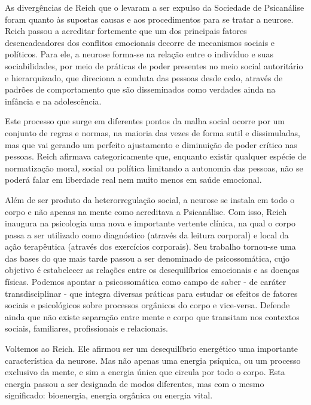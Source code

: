 As divergências de Reich que o levaram a ser expulso da Sociedade de
Psicanálise foram quanto às supostas causas e aos procedimentos para se
tratar a neurose. Reich passou a acreditar fortemente que um dos
principais fatores desencadeadores dos conflitos emocionais decorre de
mecanismos sociais e políticos. Para ele, a neurose forma-se na relação
entre o indivíduo e suas sociabilidades, por meio de práticas de poder
presentes no meio social autoritário e hierarquizado, que direciona a
conduta das pessoas desde cedo, através de padrões de comportamento que
são disseminados como verdades ainda na infância e na adolescência.

Este processo que surge em diferentes pontos da malha social ocorre por
um conjunto de regras e normas, na maioria das vezes de forma sutil e
dissimuladas, mas que vai gerando um perfeito ajustamento e diminuição
de poder crítico nas pessoas. Reich afirmava categoricamente que,
enquanto existir qualquer espécie de normatização moral, social ou
política limitando a autonomia das pessoas, não se poderá falar em
liberdade real nem muito menos em saúde emocional.

Além de ser produto da heterorregulação social, a neurose se instala em
todo o corpo e não apenas na mente como acreditava a Psicanálise. Com
isso, Reich inaugura na psicologia uma nova e importante vertente
clínica, na qual o corpo passa a ser utilizado como diagnóstico (através
da leitura corporal) e local da ação terapêutica (através dos exercícios
corporais). Seu trabalho tornou-se uma das bases do que mais tarde
passou a ser denominado de psicossomática, cujo objetivo é estabelecer
as relações entre os desequilíbrios emocionais e as doenças físicas.
Podemos apontar a psicossomática como campo de saber - de caráter
transdisciplinar - que integra diversas práticas para estudar os efeitos
de fatores sociais e psicológicos sobre processos orgânicos do corpo e
vice-versa. Defende ainda que não existe separação entre mente e corpo
que transitam nos contextos sociais, familiares, profissionais e
relacionais.

Voltemos ao Reich. Ele afirmou ser um desequilíbrio energético uma
importante característica da neurose. Mas não apenas uma energia
psíquica, ou um processo exclusivo da mente, e sim a energia única que
circula por todo o corpo. Esta energia passou a ser designada de modos
diferentes, mas com o mesmo significado: bioenergia, energia orgânica ou
energia vital.

